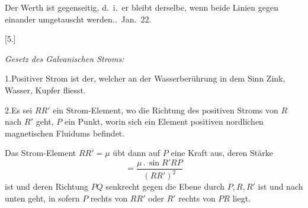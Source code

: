 Der Werth ist gegenseitig, d.\ i.\ er bleibt derselbe, wenn beide Linien gegen einander umgetauscht werden..\ Jan.\ 22.

\begin{center}[5.]\par\medskip\textit{Gesetz des Galvanischen Stroms:}\end{center}
1.\quad Positiver Strom ist der, welcher an der Wasserberührung in dem Sinn Zink, Wasser, Kupfer fliesst.

2.\quad Es sei $RR'$ ein Strom-Element, wo die Richtung des positiven Stroms von $R$ nach $R'$ geht, $P$ ein Punkt, worin sich ein Element positiven nordlichen magnetischen Fluidums befindet.

Das Strom-Element $RR'=\mu$ übt dann auf $P$ eine Kraft aus, deren Stärke
\[
=\frac{\mu\,.\,\sin R'RP}{(RR')^2}
\]
ist und deren Richtung $PQ$ senkrecht gegen die Ebene durch $P,R,R'$ ist und nach unten geht, in sofern $P$ rechts von $RR'$ oder $R'$ rechts von $PR$ liegt.
